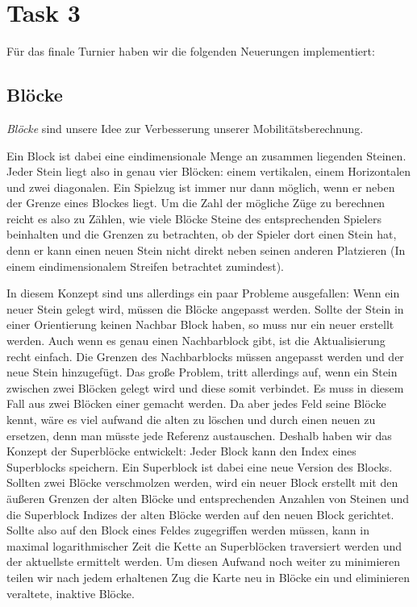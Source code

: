 \section{Task 3}
Für das finale Turnier haben wir die folgenden Neuerungen implementiert:

\subsection{Blöcke}
\textit{Blöcke} sind unsere Idee zur Verbesserung unserer Mobilitätsberechnung.

Ein Block ist dabei eine eindimensionale Menge an zusammen liegenden Steinen. Jeder Stein liegt also in genau vier Blöcken: einem vertikalen, einem Horizontalen und zwei diagonalen. Ein Spielzug ist immer nur dann möglich, wenn er neben der Grenze eines Blockes liegt. Um die Zahl der mögliche Züge zu berechnen reicht es also zu Zählen, wie viele Blöcke Steine des entsprechenden Spielers beinhalten und die Grenzen zu betrachten, ob der Spieler dort einen Stein hat, denn er kann einen neuen Stein nicht direkt neben seinen anderen Platzieren (In einem eindimensionalem Streifen betrachtet zumindest).

In diesem Konzept sind uns allerdings ein paar Probleme ausgefallen: Wenn ein neuer Stein gelegt wird, müssen die Blöcke angepasst werden. Sollte der Stein in einer Orientierung keinen Nachbar Block haben, so muss nur ein neuer erstellt werden. Auch wenn es genau einen Nachbarblock gibt, ist die Aktualisierung recht einfach. Die Grenzen des Nachbarblocks müssen angepasst werden und der neue Stein hinzugefügt. Das große Problem, tritt allerdings auf, wenn ein Stein zwischen zwei Blöcken gelegt wird und diese somit verbindet. Es muss in diesem Fall aus zwei Blöcken einer gemacht werden. Da aber jedes Feld seine Blöcke kennt, wäre es viel aufwand die alten zu löschen und durch einen neuen zu ersetzen, denn man müsste jede Referenz austauschen. Deshalb haben wir das Konzept der Superblöcke entwickelt: Jeder Block kann den Index eines Superblocks speichern. Ein Superblock ist dabei eine neue Version des Blocks. Sollten zwei Blöcke verschmolzen werden, wird ein neuer Block erstellt mit den äußeren Grenzen der alten Blöcke und entsprechenden Anzahlen von Steinen und die Superblock Indizes der alten Blöcke werden auf den neuen Block gerichtet. Sollte also auf den Block eines Feldes zugegriffen werden müssen, kann in maximal logarithmischer Zeit die Kette an Superblöcken traversiert werden und der aktuellste ermittelt werden. Um diesen Aufwand noch weiter zu minimieren teilen wir nach jedem erhaltenen Zug die Karte neu in Blöcke ein und eliminieren veraltete, inaktive Blöcke.


